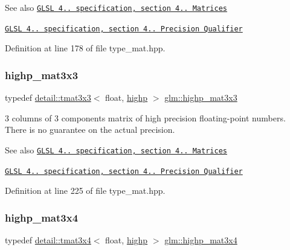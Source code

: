 \begin{DoxySeeAlso}{See also}
\href{http://www.opengl.org/registry/doc/GLSLangSpec.4.20.8.pdf}{\tt G\+L\+SL 4.. specification, section 4.. Matrices} 

\href{http://www.opengl.org/registry/doc/GLSLangSpec.4.20.8.pdf}{\tt G\+L\+SL 4.. specification, section 4.. Precision Qualifier} 
\end{DoxySeeAlso}


Definition at line 178 of file type\+\_\+mat.\+hpp.

\mbox{\label{group__core__precision_ga8a3703cc71cdfc8928eddf46b3763c4b}} 
\subsubsection{\texorpdfstring{highp\+\_\+mat3x3}{highp\_mat3x3}}
{\footnotesize\ttfamily typedef \hyperlink{structglm_1_1detail_1_1tmat3x3}{detail\+::tmat3x3}$<$ float, \hyperlink{namespaceglm_a0f04f086094c747d227af4425893f545ac6f7eab42eacbb10d59a58e95e362074}{highp} $>$ \hyperlink{group__core__precision_ga8a3703cc71cdfc8928eddf46b3763c4b}{glm\+::highp\+\_\+mat3x3}}

3 columns of 3 components matrix of high precision floating-\/point numbers. There is no guarantee on the actual precision.

\begin{DoxySeeAlso}{See also}
\href{http://www.opengl.org/registry/doc/GLSLangSpec.4.20.8.pdf}{\tt G\+L\+SL 4.. specification, section 4.. Matrices} 

\href{http://www.opengl.org/registry/doc/GLSLangSpec.4.20.8.pdf}{\tt G\+L\+SL 4.. specification, section 4.. Precision Qualifier} 
\end{DoxySeeAlso}


Definition at line 225 of file type\+\_\+mat.\+hpp.

\mbox{\label{group__core__precision_gabaf9c8dd35db715b1093042703f879d0}} 
\subsubsection{\texorpdfstring{highp\+\_\+mat3x4}{highp\_mat3x4}}
{\footnotesize\ttfamily typedef \hyperlink{structglm_1_1detail_1_1tmat3x4}{detail\+::tmat3x4}$<$ float, \hyperlink{namespaceglm_a0f04f086094c747d227af4425893f545ac6f7eab42eacbb10d59a58e95e362074}{highp} $>$ \hyperlink{group__core__precision_gabaf9c8dd35db715b1093042703f879d0}{glm\+::highp\+\_\+mat3x4}}


